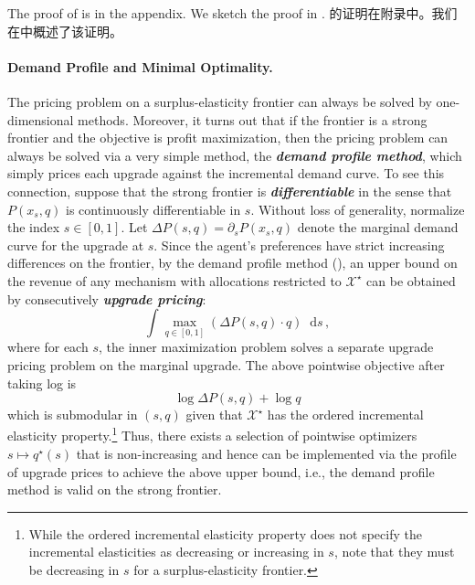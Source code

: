 \documentclass[12pt,letterpaper]{article}
\newenvironment{original}{\color{black}\noindent}{}
\newenvironment{translation}{\color{blue}\noindent}{}
\theoremstyle{plain}
\theoremstyle{definition}
\theoremstyle{remark}
\renewcommand{\1}{\mathds{1}}
\renewcommand*\d{\mathop{}\!\mathrm{d}}
\newcommand{\X}{\mathcal{X}}
\theoremstyle{definition}
\begin{document}
\begin{original}
The proof of  is in the appendix. We sketch the proof in .
\end{original}
\begin{translation}
的证明在附录中。我们在中概述了该证明。
\end{translation}

\paragraph{Demand Profile and Minimal Optimality.}\hspace{-2mm}\begin{original}The pricing problem on a surplus-elasticity frontier can always be solved by one-dimensional methods. Moreover, it turns out that if the frontier is a strong frontier and the objective is profit maximization, then the pricing problem can always be solved via a very simple method, the \textit{\textbf{demand profile method}}, which simply prices each upgrade against the incremental demand curve. To see this connection, suppose that the strong frontier is \textit{\textbf{differentiable}} in the sense that $P(x_s, q)$ is continuously differentiable in $s$. Without loss of generality, normalize the index $s \in [0, 1]$. Let $\Delta P(s, q) = \partial_s P(x_s, q)$ denote the marginal demand curve for the upgrade at $s$. Since the agent's preferences have strict increasing differences on the frontier, by the demand profile method (\citealt{wilson1993nonlinear}), an upper bound on the revenue of any mechanism with allocations restricted to $\X^\star$ can be obtained by consecutively \textit{\textbf{upgrade pricing}}:
\[\int \max_{q \in [0, 1]}(\Delta P(s, q) \cdot q) \d s\,,\]
where for each $s$, the inner maximization problem solves a separate upgrade pricing problem on the marginal upgrade. The above pointwise objective after taking log is
\[\log \Delta P(s, q) + \log q\]
which is submodular in $(s, q)$ given that $\X^\star$ has the ordered incremental elasticity property.\footnote{While the ordered incremental elasticity property does not specify the incremental elasticities as decreasing or increasing in $s$, note that they must be decreasing in $s$ for a surplus-elasticity frontier.} Thus, there exists a selection of pointwise optimizers $s \mapsto q^\star(s)$ that is non-increasing and hence can be implemented via the profile of upgrade prices to achieve the above upper bound, i.e., the demand profile method is valid on the strong frontier.
\end{original}
\end{document}
